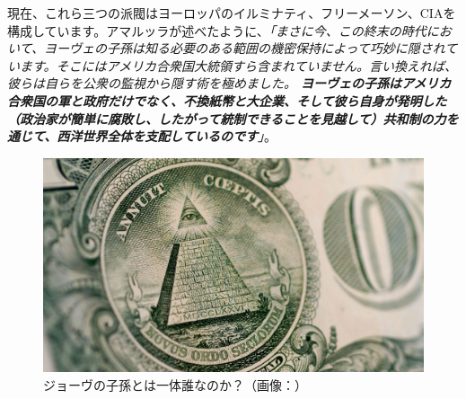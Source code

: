 \documentclass[10pt,twocolumn,letterpaper]{article}
\begin{document}
現在、これら三つの派閥はヨーロッパのイルミナティ、フリーメーソン、CIAを構成しています。アマルッラが述べたように、\textit{「まさに今、この終末の時代において、ヨーヴェの子孫は知る必要のある範囲の機密保持によって巧妙に隠されています。そこにはアメリカ合衆国大統領すら含まれていません。言い換えれば、彼らは自らを公衆の監視から隠す術を極めました。 \textbf{ヨーヴェの子孫はアメリカ合衆国の軍と政府だけでなく、不換紙幣と大企業、そして彼ら自身が発明した（政治家が簡単に腐敗し、したがって統制できることを見越して）共和制の力を通じて、西洋世界全体を支配しているのです}」}\cite{33,34}。

\begin{figure}[h]
\begin{center}
   \includegraphics[width=1\linewidth]{illuminati.jpg}

\end{center}
   \caption{ジョーヴの子孫とは一体誰なのか？（画像：\cite{35}）}
\label{fig:10}
\label{fig:onecol}
\end{figure}
\end{document}
